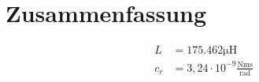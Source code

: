 \section{Zusammenfassung}


\begin{equation} \label{eq241}
    \begin{split}
       L &=  175.462 \mathrm{\mu H}\\
       c_r &= 3,24 \cdot 10^{-9} \mathrm{\frac{Nm s}{rad}}
    \end{split}
\end{equation}

